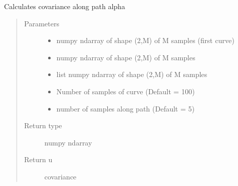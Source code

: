 \documentclass[letterpaper,10pt,english]{sphinxmanual}
\begin{document}
\begin{fulllineitems}
\label{\detokenize{geodesic:geodesic.cov_integral}}
Calculates covariance along path alpha
\begin{quote}\begin{description}
\item[{Parameters}] \leavevmode\begin{itemize}
\item {} 
 \textendash{} numpy ndarray of shape (2,M) of M samples (first curve)

\item {} 
 \textendash{} numpy ndarray of shape (2,M) of M samples

\item {} 
 \textendash{} list numpy ndarray of shape (2,M) of M samples

\item {} 
 \textendash{} Number of samples of curve (Default = 100)

\item {} 
 \textendash{} number of samples along path (Default = 5)

\end{itemize}

\item[{Return type}] \leavevmode
numpy ndarray

\item[{Return u}] \leavevmode
covariance

\end{description}\end{quote}

\end{fulllineitems}

\end{document}
